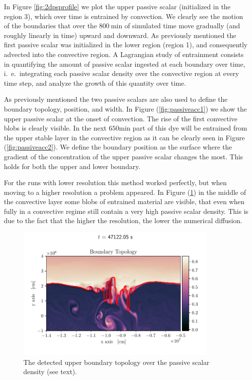 In Figure \ref{fig:2dpsprofile} we plot the upper passive scalar (initialized in the region 3), which over time is entrained by convection. We clearly see the motion of the boundaries that over the $800 \ \mathrm{min}$ of simulated time move gradually (and roughly linearly in time) upward and downward. As previously mentioned the first passive scalar was initialized in the lower region (region 1), and consequently advected into the convective region. A Lagrangian study of entrainment consists in quantifying the amount of passive scalar ingested at each boundary over time, i.\ e.\ integrating each passive scalar density over the convective region at every time step, and analyze the growth of this quantity over time.

As previously mentioned the two passive scalars are also used to define the boundary topology, position, and width. In Figure (\ref{fig:passiveacc1}) we show the upper passive scalar at the onset of convection. The rise of the first convective blobs is clearly visible. In the next $650 \mathrm{min}$ part of this dye will be entrained from the upper stable layer in the convective region as it can be clearly seen in Figure (\ref{fig:passiveacc2}). We define the boundary position as the surface where the gradient of the concentration of the upper passive scalar changes the most. This holds for both the upper and lower boundary.
  
For the runs with lower resolution this method worked perfectly, but when moving to a higher resolution a problem appeared. In Figure (\ref{fig:topology})  in the middle of the convective layer some blobs of entrained material are visible, that even when fully in a convective regime still contain a very high passive scalar density. This is due to the fact that the higher the resolution, the lower the numerical diffusion.
  
\begin{figure}[t!]
\centering
\includegraphics[width=10cm]{./img/topology.pdf}
\caption{The detected upper boundary topology over the passive scalar density (see text).}
\label{fig:topology}
\centering
\end{figure}


